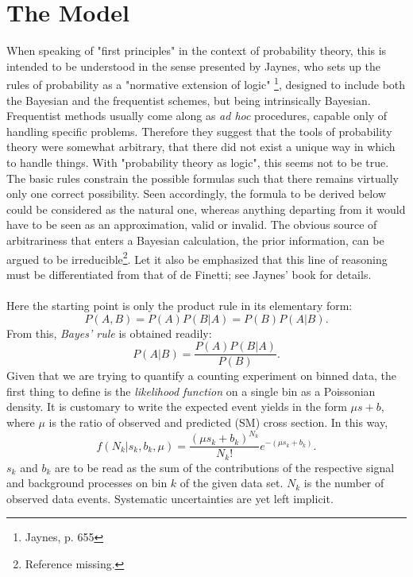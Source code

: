\documentclass[aps,prb,twocolumn,showpacs,superscriptaddress,groupedaddress]{revtex4}  %
\begin{document}
\section{The Model}
When speaking of "first principles" in the context of probability theory, this is intended to be understood in the sense presented by Jaynes\cite{jaynes}, who sets up the rules of probability as a "normative extension of logic" \footnote{Jaynes, p. 655}, designed to include both the Bayesian and the frequentist schemes, but being intrinsically Bayesian. Frequentist methods usually come along as \emph{ad hoc} procedures, capable only of handling specific problems. Therefore they suggest that the tools of probability theory were somewhat arbitrary, that there did not exist a unique way in which to handle things. With "probability theory as logic", this seems not to be true. The basic rules constrain the possible formulas such that there remains virtually only one correct possibility. Seen accordingly, the formula to be derived below could be considered as the natural one, whereas anything departing from it would have to be seen as an approximation, valid or invalid. The obvious source of arbitrariness that enters a Bayesian calculation, the prior information, can be argued to be irreducible\footnote{Reference missing.}. Let it also be emphasized that this line of reasoning must be differentiated from that of de Finetti; see Jaynes' book for details.\\
\\
Here the starting point is only the product rule in its elementary form:
\begin{equation}
P(A,B)=P(A)P(B|A)=P(B)P(A|B).
\end{equation}
From this, \emph{Bayes' rule} is obtained readily:
\begin{equation}
P(A|B)=\frac{P(A)P(B|A)}{P(B)}.
\end{equation}
Given that we are trying to quantify a counting experiment on binned data, the first thing to define is the \emph{likelihood function} on a single bin as a Poissonian density. It is customary to write the expected event yields in the form $\mu s + b$, where $\mu$ is the ratio of observed and predicted (SM) cross section. In this way,
\begin{equation}
f(N_{k}|s_{k},b_{k},\mu)=\frac{(\mu s_{k}+b_{k})^{N_{k}}}{N_{k}!}e^{-(\mu s_{k}+b_{k})}.
\end{equation}
$s_{k}$ and $b_{k}$ are to be read as the sum of the contributions of the respective signal and background processes on bin $k$ of the given data set. $N_{k}$ is the number of observed data events. Systematic uncertainties are yet left implicit.\\
\end{document}
